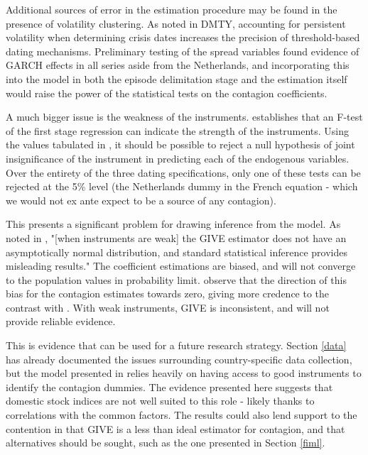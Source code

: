 \documentclass[/../base.tex]{subfiles}
\begin{document}
Additional sources of error in the estimation procedure may be found in the presence of volatility clustering. As noted in DMTY, accounting for persistent volatility when determining crisis dates increases the precision of threshold-based dating mechanisms. Preliminary testing of the spread variables found evidence of GARCH effects in all series aside from the Netherlands, and incorporating this into the model in both the episode delimitation stage and the estimation itself would raise the power of the statistical tests on the contagion coefficients. 

A much bigger issue is the weakness of the instruments. \cite{cragg1993testing} establishes that an F-test of the first stage regression can indicate the strength of the instruments. Using the values tabulated in \cite{stock2005testing}, it should be possible to reject a null hypothesis of joint insignificance of the instrument in predicting each of the endogenous variables. Over the entirety of the three dating specifications, only one of these tests can be rejected at the 5\% level (the Netherlands dummy in the French equation - which we would not ex ante expect to be a source of any contagion).

This presents a significant problem for drawing inference from the model. As noted in \cite{massacci2007identification}, "[when instruments are weak] the GIVE estimator does not have an asymptotically normal distribution, and standard statistical inference provides misleading results."  The coefficient estimations are biased, and will not converge to the population values in probability limit. \cite{mondria2013financial} observe that the direction of this bias for the contagion estimates towards zero, giving more credence to the contrast with \cite{metiu2012sovereign}. With weak instruments, GIVE is inconsistent, and will not provide reliable evidence. 

This is evidence that can be used for a future research strategy. Section \ref{data} has already documented the issues surrounding country-specific data collection, but the model presented in \cite{pesaran2007econometric} relies heavily on having access to good instruments to identify the contagion dummies. The evidence presented here suggests that domestic stock indices are not well suited to this role - likely thanks to correlations with the common factors. The results could also lend support to the contention in \cite{massacci2007identification} that GIVE is a less than ideal estimator for contagion, and that alternatives should be sought, such as the one presented in Section \ref{fiml}.
\end{document}
